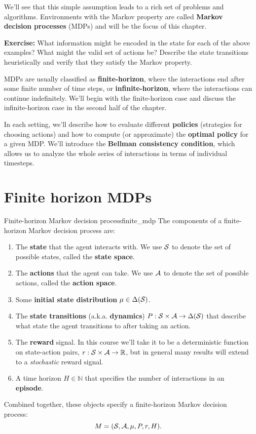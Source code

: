 \documentclass[\main/main]{subfiles}
\begin{document}
We'll see that this simple assumption leads to a rich set of problems and algorithms. Environments with the Markov property are called \textbf{Markov decision processes} (MDPs) and will be the focus of this chapter.

\textbf{Exercise:} What information might be encoded in the state for each of the above examples? What might the valid set of actions be? Describe the state transitions heuristically and verify that they satisfy the Markov property.

MDPs are usually classified as \textbf{finite-horizon}, where the interactions end after some finite number of time steps, or \textbf{infinite-horizon}, where the interactions can continue indefinitely. We'll begin with the finite-horizon case and discuss the infinite-horizon case in the second half of the chapter.

In each setting, we'll describe how to evaluate different \textbf{policies} (strategies for choosing actions) and how to compute (or approximate) the \textbf{optimal policy} for a given MDP. We'll introduce the \textbf{Bellman consistency condition}, which allows us to analyze the whole series of interactions in terms of individual timesteps.

\newpage
\section{Finite horizon MDPs}


\begin{definition}{Finite-horizon Markov decision process}{finite_mdp}
The components of a finite-horizon Markov decision process are:

\begin{enumerate}
    \item The \textbf{state} that the agent interacts with. We use $\S$ to denote the set of possible states, called the \textbf{state space}.
    \item The \textbf{actions} that the agent can take. We use $\A$ to denote the set of possible actions, called the \textbf{action space}.
    \item Some \textbf{initial state distribution} $\mu \in \Delta(\S)$.
    \item The \textbf{state transitions} (a.k.a. \textbf{dynamics}) $P : \S \times \A \to \Delta(\S)$ that describe what state the agent transitions to after taking an action.
    \item The \textbf{reward} signal. In this course we'll take it to be a deterministic function on state-action pairs, $r : \S \times \A \to \mathbb{R}$, but in general many results will extend to a \emph{stochastic} reward signal.
    \item A time horizon $H \in \mathbb{N}$ that specifies the number of interactions in an \textbf{episode}.
\end{enumerate}

Combined together, these objects specify a finite-horizon Markov decision process:
\[
    M = (\S, \A, \mu, P, r, H).
\]
\end{definition}
\end{document}
